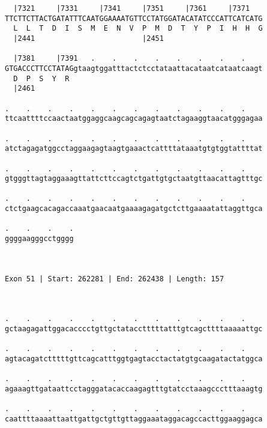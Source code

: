 \documentclass{article}
\begin{document}
\begin{Verbatim}
  |7321     |7331     |7341     |7351     |7361     |7371   
TTCTTCTTACTGATATTTCAATGGAAAATGTTCCTATGGATACATATCCCATTCATCATG
  L  L  T  D  I  S  M  E  N  V  P  M  D  T  Y  P  I  H  H  G
  |2441                         |2451                       
  
  |7381     |7391   .    .    .    .    .    .    .    .    
GTGACCCTTCCTATAGgtaagtggatttactctcctataattacataatcataatcaagt
  D  P  S  Y  R                                             
  |2461                                                     
  
.    .    .    .    .    .    .    .    .    .    .    .    
ttcaattttccaactaatggaggcaagcagcagagtaatctagaaggtaacatgggagaa
                                                            
.    .    .    .    .    .    .    .    .    .    .    .    
atctagagatggcctaggaagagtaagtgaaactcattttataaatgtgtggtattttat
                                                            
.    .    .    .    .    .    .    .    .    .    .    .    
gtgggttagtaggaaagttattcttccagtctgattgtgctaatgttaacattagtttgc
                                                            
.    .    .    .    .    .    .    .    .    .    .    .    
ctctgaagcacagaccaaatgaacaatgaaaagagatgctcttgaaaatattaggttgca
                                                            
.    .    .    .
ggggaagggcctgggg
                
                
 
Exon 51 | Start: 262281 | End: 262438 | Length: 157



.    .    .    .    .    .    .    .    .    .    .    .    
gctaagagattggacacccctgttgctatacctttttatttgtcagcttttaaaaattgc
                                                            
.    .    .    .    .    .    .    .    .    .    .    .    
agtacagatctttttgttcagcatttggtgagtacctactatgtgcaagatactatggca
                                                            
.    .    .    .    .    .    .    .    .    .    .    .    
agaaagttgataattcctagggatacaccaagagtttgtatcctaaagccctttaaagtg
                                                            
.    .    .    .    .    .    .    .    .    .    .    .    
caattttaaaattaattgattgctgttgttaggaaataggacagccacttggaaggagca
                                                            

\end{Verbatim}
\end{document}
